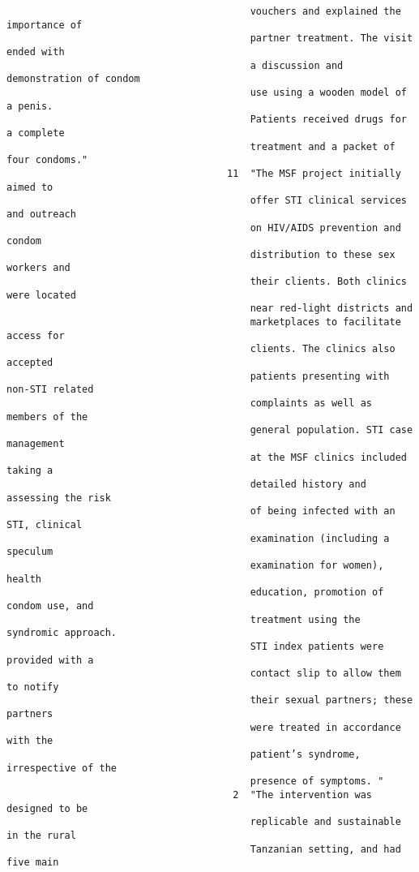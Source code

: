 \documentclass{article}
\begin{document}
\begin{verbatim}
                                          vouchers and explained the importance of
                                          partner treatment. The visit ended with
                                          a discussion and demonstration of condom
                                          use using a wooden model of a penis.
                                          Patients received drugs for a complete
                                          treatment and a packet of four condoms."
                                      11  "The MSF project initially aimed to
                                          offer STI clinical services and outreach
                                          on HIV/AIDS prevention and condom
                                          distribution to these sex workers and
                                          their clients. Both clinics were located
                                          near red-light districts and
                                          marketplaces to facilitate access for
                                          clients. The clinics also accepted
                                          patients presenting with non-STI related
                                          complaints as well as members of the
                                          general population. STI case management
                                          at the MSF clinics included taking a
                                          detailed history and assessing the risk
                                          of being infected with an STI, clinical
                                          examination (including a speculum
                                          examination for women), health
                                          education, promotion of condom use, and
                                          treatment using the syndromic approach.
                                          STI index patients were provided with a
                                          contact slip to allow them to notify
                                          their sexual partners; these partners
                                          were treated in accordance with the
                                          patient’s syndrome, irrespective of the
                                          presence of symptoms. "
                                       2  "The intervention was designed to be
                                          replicable and sustainable in the rural
                                          Tanzanian setting, and had five main

\end{verbatim}
\end{document}

